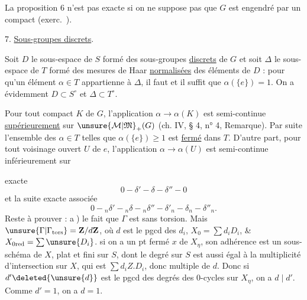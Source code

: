 La proposition 6 n'est pas exacte si on ne suppose pas que $G$ est engendré par un compact (exerc.\ ).

7. \uline{Sous-groupes discrets}.

Soit $D$ le sous-espace de $S$ formé des sous-groupes \uline{discrets} de $G$ et soit $\Delta$ le sous-espace de $T$ formé des mesures de Haar \uline{normalisées} des éléments de $D$ : pour qu'un élément $\alpha\in T$ appartienne à $\Delta$, il faut et il suffit que $\alpha(\{e\})=1$. On a évidemment $D\subset S^\circ$ et $\Delta\subset T^\circ$.

Pour tout compact $K$ de $G$, l'application $\alpha\longrightarrow\alpha(K)$ est semi-continue \uline{supérieurement} sur $\unsure{\mathcal M|\mathfrak M}_+(G)$ (ch. IV, § 4, n° 4, Remarque). Par suite l'ensemble des $\alpha\in T$ telles que $\alpha(\{e\})\geq 1$ est \uline{fermé} dans $T$. D'autre part, pour tout voisinage ouvert $U$ de $e$, l'application $\alpha\longrightarrow\alpha(U)$ est semi-continue inférieurement sur

exacte
\[
0\mathbin{-}\delta'\mathbin{-}\delta\mathbin{-}\delta''\mathbin{-}0
\]
et la suite exacte associée
\[
0\mathbin{-}{}_n\delta'\mathbin{-}{}_n\delta\mathbin{-}{}_n\delta''\mathbin{-}\delta'_n\mathbin{-}\delta_n\mathbin{-}\delta''_n.
\]
Reste à prouver : \textcircled{a}) le fait que $\Gamma$ est sans torsion. Mais $\unsure{\Gamma|\Gamma_{\mathrm{tors}}}=\mathbf Z/d\mathbf Z$, où $d$ est le pgcd des $d_i$, $X_0=\sum d_iD_i$, \& $X_{0\mathrm{red}}=\sum\unsure{D_i}$.  si on a un pt fermé $x$ de $X_\eta$, son adhérence  est un sous-schéma   de $X$, plat et fini sur $S$,  dont le degré sur $S$ est aussi égal à la multiplicité d'intersection  sur $X$, qui est $\sum d_iZ.D_i$, donc multiple de $d$. Donc si $d'\deleted{\unsure{d}}$ est le pgcd des degrés des 0-cycles sur $X_\eta$, on a $d\mid d'$. Comme $d'=1$, on a $d=1$.


